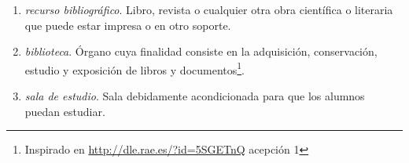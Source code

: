 \begin{enumerate}
    \item \emph{recurso bibliográfico}. Libro, revista o cualquier otra obra
        científica o literaria que puede estar impresa o en otro soporte. 

    \item \emph{biblioteca}. Órgano cuya finalidad consiste en la adquisición,
        conservación, estudio y exposición de libros y
        documentos\footnote{Inspirado en \url{http://dle.rae.es/?id=5SGETnQ}
        acepción 1}.

    \item \emph{sala de estudio}. Sala debidamente acondicionada para que los
        alumnos puedan estudiar. 

\end{enumerate}

{}

